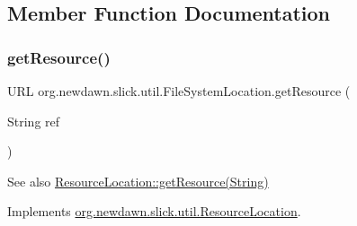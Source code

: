 \subsection{Member Function Documentation}
\mbox{\label{classorg_1_1newdawn_1_1slick_1_1util_1_1_file_system_location_ad667c6a3c97a76caf89ffa816904033a}} 
\subsubsection{\texorpdfstring{get\+Resource()}{getResource()}}
{\footnotesize\ttfamily U\+RL org.\+newdawn.\+slick.\+util.\+File\+System\+Location.\+get\+Resource (\begin{DoxyParamCaption}\item[{String}]{ref }\end{DoxyParamCaption})\hspace{0.3cm}{\ttfamily [inline]}}

\begin{DoxySeeAlso}{See also}
\mbox{\hyperlink{interfaceorg_1_1newdawn_1_1slick_1_1util_1_1_resource_location_a3f83afd2bf20002625526dc19ddfff96}{Resource\+Location\+::get\+Resource(\+String)}} 
\end{DoxySeeAlso}


Implements \mbox{\hyperlink{interfaceorg_1_1newdawn_1_1slick_1_1util_1_1_resource_location_a3f83afd2bf20002625526dc19ddfff96}{org.\+newdawn.\+slick.\+util.\+Resource\+Location}}.


